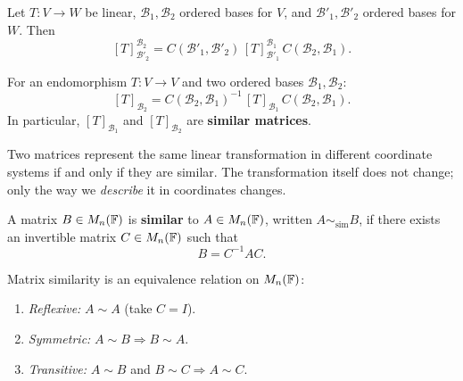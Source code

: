 \begin{thmbox}
\label{thm:cob-lt}
Let $T:V\to W$ be linear, $\mathcal{B}_1,\mathcal{B}_2$ ordered bases for $V$,
and $\mathcal{B}'_1,\mathcal{B}'_2$ ordered bases for $W$.  Then
\[
    [T]^{\mathcal{B}_2}_{\mathcal{B}'_2}
    = C(\mathcal{B}'_1,\mathcal{B}'_2)\,[T]^{\mathcal{B}_1}_{\mathcal{B}'_1}\,
      C(\mathcal{B}_2,\mathcal{B}_1).
\]
\end{thmbox}

\begin{corbox}
\label{cor:cob-endo}
For an endomorphism $T:V\to V$ and two ordered bases $\mathcal{B}_1,\mathcal{B}_2$:
\[
    [T]_{\mathcal{B}_2}
    = C(\mathcal{B}_2,\mathcal{B}_1)^{-1}\,[T]_{\mathcal{B}_1}\,
      C(\mathcal{B}_2,\mathcal{B}_1).
\]
In particular, $[T]_{\mathcal{B}_1}$ and $[T]_{\mathcal{B}_2}$ are
\textbf{similar matrices}.
\end{corbox}

\begin{tipbox}
Two matrices represent the same linear transformation in different coordinate
systems if and only if they are similar.  The transformation itself does not
change; only the way we \emph{describe} it in coordinates changes.
\end{tipbox}

\begin{defbox}
\label{def:similar}
A matrix $B\in M_{n}(\mathbb{F})$ is \textbf{similar} to $A\in M_{n}(\mathbb{F})$, written
$A\sim_{\mathrm{sim}} B$, if there exists an invertible matrix $C\in M_{n}(\mathbb{F})$
such that
\[
    B = C^{-1}AC.
\]
\end{defbox}

\begin{propbox}
\label{prop:similarity-equivalence}
Matrix similarity is an equivalence relation on $M_{n}(\mathbb{F})$:
\begin{enumerate}[label=(\roman*)]
    \item \emph{Reflexive:} $A\sim A$ (take $C=I$).
    \item \emph{Symmetric:} $A\sim B\Rightarrow B\sim A$.
    \item \emph{Transitive:} $A\sim B$ and $B\sim C\Rightarrow A\sim C$.
\end{enumerate}
\end{propbox}
